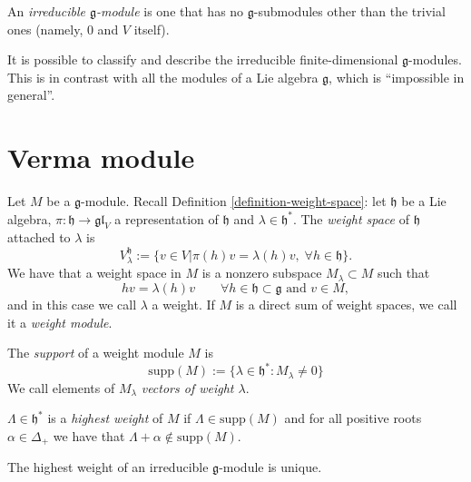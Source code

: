 \begin{definition}
\label{definition-irreducible-g-module}
An {\it irreducible $\mathfrak{g}$-module} is one that has
no $\mathfrak{g}$-submodules other than the
trivial ones (namely, 0 and $V$ itself).
\end{definition}

It is possible to classify and describe the 
irreducible finite-dimensional
$\mathfrak{g}$-modules. This is in contrast
with all the modules of a Lie algebra $\mathfrak{g}$,
which is ``impossible in general''.

\section{Verma module}
\label{section-Verma-module}

Let $M$ be a $\mathfrak{g}$-module. Recall 
Definition \ref{definition-weight-space}: 
let $\mathfrak{h}$ be a Lie algebra, 
$\pi:\mathfrak{h}\to\mathfrak{gl}_V$ a representation of $\mathfrak{h}$ 
and $\lambda \in \mathfrak{h}^*$. The {\it weight space} of $\mathfrak{h}$
attached to $\lambda$ is
$$
V_\lambda^{\mathfrak{h}}:=\{v \in V|\pi(h)v=\lambda(h)v,\; 
\forall h \in \mathfrak{h}\}.
$$
We have
that a weight space in $M$ is a nonzero subspace
$M_\lambda \subset M$ such that
$$
hv=\lambda(h)v \qquad \forall h \in \mathfrak{h}\subset\mathfrak{g}
\text{ and }v \in M,
$$
and in this case we call $\lambda$ a weight.
If $M$ is a direct sum of weight spaces, we
call it a {\it weight module}.

The {\it support} of a weight module $M$ is
\begin{equation}
\label{equation-support-of-weight-module}
\text{supp}(M):=\{\lambda \in \mathfrak{h}^*:M_\lambda\neq 0\}
\end{equation}
We call elements of $M_\lambda$ {\it vectors
of weight $\lambda$}.

\begin{definition}
\label{definition-highest-root}
$\Lambda \in \mathfrak{h}^*$ is a 
{\it highest weight} of $M$ 
if $\Lambda \in \text{supp}(M)$
and for all positive roots $\alpha \in \Delta_+$
we have that $\Lambda+\alpha \not\in\text{supp}(M)$.
\end{definition}

\begin{exercise}
\label{exercise-highest-weight-of-an-irreducible-g-module-is-unique}
The highest weight of an irreducible $\mathfrak{g}$-module
is unique.
\end{exercise}

